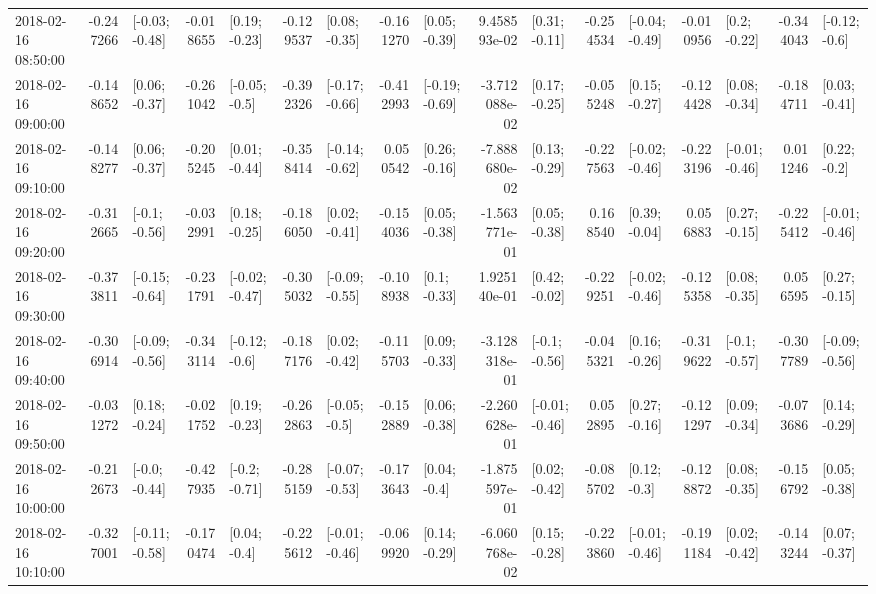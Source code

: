 \begin{tabular}{lrlrlrlrlrlrlrlrl}
2018-02-16 08:50:00 & -0.247266 &  [-0.03; -0.48] & -0.018655 &   [0.19; -0.23] & -0.129537 &   [0.08; -0.35] & -0.161270 &   [0.05; -0.39] &  9.458593e-02 &   [0.31; -0.11] & -0.254534 &  [-0.04; -0.49] & -0.010956 &    [0.2; -0.22] & -0.344043 &   [-0.12; -0.6] \\
2018-02-16 09:00:00 & -0.148652 &   [0.06; -0.37] & -0.261042 &   [-0.05; -0.5] & -0.392326 &  [-0.17; -0.66] & -0.412993 &  [-0.19; -0.69] & -3.712088e-02 &   [0.17; -0.25] & -0.055248 &   [0.15; -0.27] & -0.124428 &   [0.08; -0.34] & -0.184711 &   [0.03; -0.41] \\
2018-02-16 09:10:00 & -0.148277 &   [0.06; -0.37] & -0.205245 &   [0.01; -0.44] & -0.358414 &  [-0.14; -0.62] &  0.050542 &   [0.26; -0.16] & -7.888680e-02 &   [0.13; -0.29] & -0.227563 &  [-0.02; -0.46] & -0.223196 &  [-0.01; -0.46] &  0.011246 &    [0.22; -0.2] \\
2018-02-16 09:20:00 & -0.312665 &   [-0.1; -0.56] & -0.032991 &   [0.18; -0.25] & -0.186050 &   [0.02; -0.41] & -0.154036 &   [0.05; -0.38] & -1.563771e-01 &   [0.05; -0.38] &  0.168540 &   [0.39; -0.04] &  0.056883 &   [0.27; -0.15] & -0.225412 &  [-0.01; -0.46] \\
2018-02-16 09:30:00 & -0.373811 &  [-0.15; -0.64] & -0.231791 &  [-0.02; -0.47] & -0.305032 &  [-0.09; -0.55] & -0.108938 &    [0.1; -0.33] &  1.925140e-01 &   [0.42; -0.02] & -0.229251 &  [-0.02; -0.46] & -0.125358 &   [0.08; -0.35] &  0.056595 &   [0.27; -0.15] \\
2018-02-16 09:40:00 & -0.306914 &  [-0.09; -0.56] & -0.343114 &   [-0.12; -0.6] & -0.187176 &   [0.02; -0.42] & -0.115703 &   [0.09; -0.33] & -3.128318e-01 &   [-0.1; -0.56] & -0.045321 &   [0.16; -0.26] & -0.319622 &   [-0.1; -0.57] & -0.307789 &  [-0.09; -0.56] \\
2018-02-16 09:50:00 & -0.031272 &   [0.18; -0.24] & -0.021752 &   [0.19; -0.23] & -0.262863 &   [-0.05; -0.5] & -0.152889 &   [0.06; -0.38] & -2.260628e-01 &  [-0.01; -0.46] &  0.052895 &   [0.27; -0.16] & -0.121297 &   [0.09; -0.34] & -0.073686 &   [0.14; -0.29] \\
2018-02-16 10:00:00 & -0.212673 &   [-0.0; -0.44] & -0.427935 &   [-0.2; -0.71] & -0.285159 &  [-0.07; -0.53] & -0.173643 &    [0.04; -0.4] & -1.875597e-01 &   [0.02; -0.42] & -0.085702 &    [0.12; -0.3] & -0.128872 &   [0.08; -0.35] & -0.156792 &   [0.05; -0.38] \\
2018-02-16 10:10:00 & -0.327001 &  [-0.11; -0.58] & -0.170474 &    [0.04; -0.4] & -0.225612 &  [-0.01; -0.46] & -0.069920 &   [0.14; -0.29] & -6.060768e-02 &   [0.15; -0.28] & -0.223860 &  [-0.01; -0.46] & -0.191184 &   [0.02; -0.42] & -0.143244 &   [0.07; -0.37] \\

\end{tabular}
